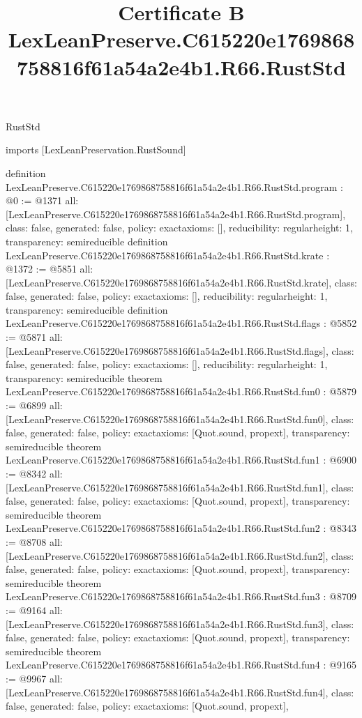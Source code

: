 \begin{lexlean}{RustStd}
\title{Certificate B LexLeanPreserve.C615220e1769868758816f61a54a2e4b1.R66.RustStd}
\begin{coremodule}
imports [LexLeanPreservation.RustSound]

definition LexLeanPreserve.C615220e1769868758816f61a54a2e4b1.R66.RustStd.program : @0 := @1371 {
  all: [LexLeanPreserve.C615220e1769868758816f61a54a2e4b1.R66.RustStd.program],
  class: false,
  generated: false,
  policy: exact{axioms: []},
  reducibility: regular{height: 1},
  transparency: semireducible
}
definition LexLeanPreserve.C615220e1769868758816f61a54a2e4b1.R66.RustStd.krate : @1372 := @5851 {
  all: [LexLeanPreserve.C615220e1769868758816f61a54a2e4b1.R66.RustStd.krate],
  class: false,
  generated: false,
  policy: exact{axioms: []},
  reducibility: regular{height: 1},
  transparency: semireducible
}
definition LexLeanPreserve.C615220e1769868758816f61a54a2e4b1.R66.RustStd.flags : @5852 := @5871 {
  all: [LexLeanPreserve.C615220e1769868758816f61a54a2e4b1.R66.RustStd.flags],
  class: false,
  generated: false,
  policy: exact{axioms: []},
  reducibility: regular{height: 1},
  transparency: semireducible
}
theorem LexLeanPreserve.C615220e1769868758816f61a54a2e4b1.R66.RustStd.fun0 : @5879 := @6899 {
  all: [LexLeanPreserve.C615220e1769868758816f61a54a2e4b1.R66.RustStd.fun0],
  class: false,
  generated: false,
  policy: exact{axioms: [Quot.sound, propext]},
  transparency: semireducible
}
theorem LexLeanPreserve.C615220e1769868758816f61a54a2e4b1.R66.RustStd.fun1 : @6900 := @8342 {
  all: [LexLeanPreserve.C615220e1769868758816f61a54a2e4b1.R66.RustStd.fun1],
  class: false,
  generated: false,
  policy: exact{axioms: [Quot.sound, propext]},
  transparency: semireducible
}
theorem LexLeanPreserve.C615220e1769868758816f61a54a2e4b1.R66.RustStd.fun2 : @8343 := @8708 {
  all: [LexLeanPreserve.C615220e1769868758816f61a54a2e4b1.R66.RustStd.fun2],
  class: false,
  generated: false,
  policy: exact{axioms: [Quot.sound, propext]},
  transparency: semireducible
}
theorem LexLeanPreserve.C615220e1769868758816f61a54a2e4b1.R66.RustStd.fun3 : @8709 := @9164 {
  all: [LexLeanPreserve.C615220e1769868758816f61a54a2e4b1.R66.RustStd.fun3],
  class: false,
  generated: false,
  policy: exact{axioms: [Quot.sound, propext]},
  transparency: semireducible
}
theorem LexLeanPreserve.C615220e1769868758816f61a54a2e4b1.R66.RustStd.fun4 : @9165 := @9967 {
  all: [LexLeanPreserve.C615220e1769868758816f61a54a2e4b1.R66.RustStd.fun4],
  class: false,
  generated: false,
  policy: exact{axioms: [Quot.sound, propext]},
}
\end{coremodule}
\end{lexlean}
